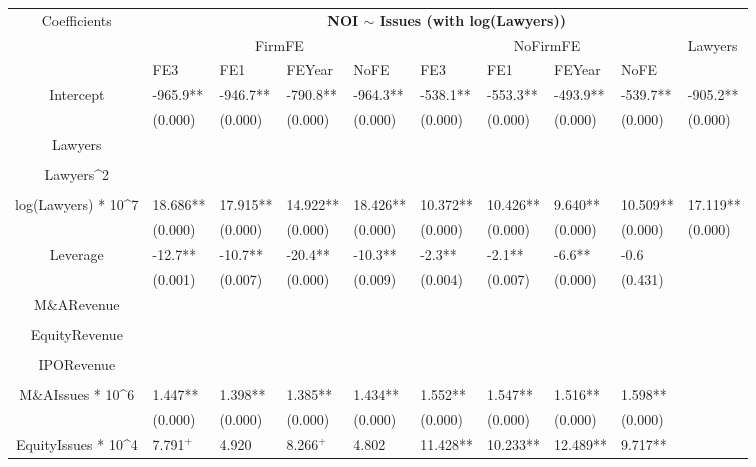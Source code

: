 \documentclass{article}
\begin{document}
\begin{table}[H]
\centering
\begin{tabular}{|clllllllll|}
\hline
\multirow{3}{*}{Coefficients} & \multicolumn{9}{c|}{\textbf{NOI $\sim$ Issues (with log(Lawyers))}} \\
\cline{2-10}
& \multicolumn{4}{c}{FirmFE} & \multicolumn{4}{c}{NoFirmFE} & \multirow{2}{*}{Lawyers} \\
\cline{2-9}
& FE3 & FE1 & FEYear & NoFE & FE3 & FE1 & FEYear & NoFE &  \\
\hline
 
Intercept & -965.9** & -946.7** & -790.8** & -964.3** & -538.1** & -553.3** & -493.9** & -539.7** & -905.2** \\ 
   & (0.000) & (0.000) & (0.000) & (0.000) & (0.000) & (0.000) & (0.000) & (0.000) & (0.000) \\ 
  Lawyers &  &  &  &  &  &  &  &  &  \\ 
   &  &  &  &  &  &  &  &  &  \\ 
  Lawyers^2 &  &  &  &  &  &  &  &  &  \\ 
   &  &  &  &  &  &  &  &  &  \\ 
  log(Lawyers) * 10^7 & 18.686** & 17.915** & 14.922** & 18.426** & 10.372** & 10.426** & 9.640** & 10.509** & 17.119** \\ 
   & (0.000) & (0.000) & (0.000) & (0.000) & (0.000) & (0.000) & (0.000) & (0.000) & (0.000) \\ 
  Leverage & -12.7** & -10.7** & -20.4** & -10.3** & -2.3** & -2.1** & -6.6** & -0.6 &  \\ 
   & (0.001) & (0.007) & (0.000) & (0.009) & (0.004) & (0.007) & (0.000) & (0.431) &  \\ 
  M\&ARevenue &  &  &  &  &  &  &  &  &  \\ 
   &  &  &  &  &  &  &  &  &  \\ 
  EquityRevenue &  &  &  &  &  &  &  &  &  \\ 
   &  &  &  &  &  &  &  &  &  \\ 
  IPORevenue &  &  &  &  &  &  &  &  &  \\ 
   &  &  &  &  &  &  &  &  &  \\ 
  M\&AIssues * 10^6 & 1.447** & 1.398** & 1.385** & 1.434** & 1.552** & 1.547** & 1.516** & 1.598** &  \\ 
   & (0.000) & (0.000) & (0.000) & (0.000) & (0.000) & (0.000) & (0.000) & (0.000) &  \\ 
  EquityIssues * 10^4 & 7.791$^{+}$ & 4.920 & 8.266$^{+}$ & 4.802 & 11.428** & 10.233** & 12.489** & 9.717** &  \\ 

\end{tabular}
\end{table}
\end{document}
